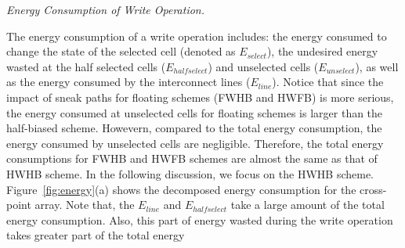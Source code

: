 \vspace{6pt} \emph{Energy Consumption of Write Operation.} \vspace{6pt}

The energy consumption of a write operation includes: the energy consumed
to change the state of the selected cell (denoted as $E_{select}$), the
undesired energy wasted at the half selected cells ($E_{halfselect}$) and
unselected cells ($E_{unselect}$), as well as the energy consumed by the
interconnect lines ($E_{line}$). Notice that since the impact of sneak
paths for floating schemes (FWHB and HWFB) is more serious, the energy
consumed at unselected cells for floating schemes is larger than the
half-biased scheme. Howevern, compared to the total energy consumption, the
energy consumed by unselected cells are negligible. Therefore, the total
energy consumptions for FWHB and HWFB schemes are almost the same as that
of HWHB scheme. In the following discussion, we focus on the HWHB scheme.
Figure~\ref{fig:energy}(a) shows the decomposed energy consumption for the
cross-point array. Note that, the $E_{line}$ and $E_{halfselect}$ take a
large amount of the total energy consumption. Also, this part of energy
wasted during the write operation takes greater part of the total energy

